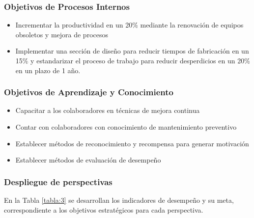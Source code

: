 \documentclass[12pt, a4paper]{article}
\begin{document}
		\subsubsection{Objetivos de Procesos Internos}
	\begin{itemize}	
		\item Incrementar la productividad en un 20\% mediante la renovación de equipos obsoletos y mejora de procesos 
		\item Implementar una sección de diseño para reducir tiempos de fabricación en un 15\% y estandarizar el proceso de trabajo para reducir desperdicios en un 20\% en un plazo de 1 año.
		
	\end{itemize}
	
	\subsubsection{Objetivos de Aprendizaje y Conocimiento}
	\begin{itemize}	
		\item Capacitar a los colaboradores en técnicas de mejora continua
		\item Contar con colaboradores con conocimiento de mantenimiento preventivo
		\item Establecer métodos de reconocimiento y recompensa para generar motivación
		\item Establecer métodos de evaluación de desempeño
	\end{itemize}
\subsubsection{Despliegue de perspectivas}

En la Tabla \ref{tabla:3} se desarrollan los indicadores de desempeño y su meta, correspondiente a los objetivos estratégicos para cada perspectiva.
	
\end{document}
